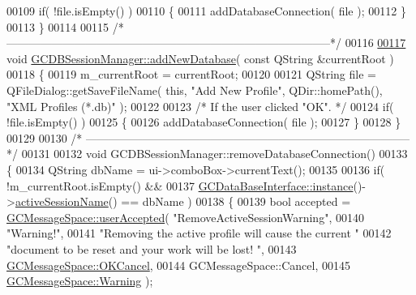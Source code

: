 \begin{DoxyCode}
00109   \textcolor{keywordflow}{if}( !file.isEmpty() )
00110   \{
00111     addDatabaseConnection( file );
00112   \}
00113 \}
00114 
00115 \textcolor{comment}{/*
      --------------------------------------------------------------------------------------*/}
00116 
\hypertarget{gcdbsessionmanager_8cpp_source_l00117}{}\hyperlink{class_g_c_d_b_session_manager_ad029ca4ec8ffff788a281f1b3f3eee71}{00117} \textcolor{keywordtype}{void} \hyperlink{class_g_c_d_b_session_manager_ad029ca4ec8ffff788a281f1b3f3eee71}{GCDBSessionManager::addNewDatabase}( \textcolor{keyword}{const} QString &currentRoot )
00118 \{
00119   m\_currentRoot = currentRoot;
00120 
00121   QString file = QFileDialog::getSaveFileName( \textcolor{keyword}{this}, \textcolor{stringliteral}{"Add New Profile"}, 
      QDir::homePath(), \textcolor{stringliteral}{"XML Profiles (*.db)"} );
00122 
00123   \textcolor{comment}{/* If the user clicked "OK". */}
00124   \textcolor{keywordflow}{if}( !file.isEmpty() )
00125   \{
00126     addDatabaseConnection( file );
00127   \}
00128 \}
00129 
00130 \textcolor{comment}{/*
      --------------------------------------------------------------------------------------*/}
00131 
00132 \textcolor{keywordtype}{void} GCDBSessionManager::removeDatabaseConnection()
00133 \{
00134   QString dbName = ui->comboBox->currentText();
00135 
00136   \textcolor{keywordflow}{if}( !m\_currentRoot.isEmpty() &&
00137       \hyperlink{class_g_c_data_base_interface_a1baea9c0667aa8b610ec30076fcab84c}{GCDataBaseInterface::instance}()->\hyperlink{class_g_c_data_base_interface_a53aff43e5997c5f0180ba214205e5bc6}{activeSessionName}() == dbName )
00138   \{
00139     \textcolor{keywordtype}{bool} accepted = \hyperlink{namespace_g_c_message_space_ae6f97d25f38a6b35c49e6e67ce4afaca}{GCMessageSpace::userAccepted}( \textcolor{stringliteral}{"RemoveActiveSessionWarning"},
00140                                                   \textcolor{stringliteral}{"Warning!"},
00141                                                   \textcolor{stringliteral}{"Removing the active profile
       will cause the current "}
00142                                                   \textcolor{stringliteral}{"document to be reset and
       your work will be lost! "},
00143                                                   \hyperlink{namespace_g_c_message_space_ac1db082c29062fe6508ba03bf76bea44a7de67bd6b388b96a468fcf8246dfdece}{GCMessageSpace::OKCancel},
00144                                                   GCMessageSpace::Cancel,
00145                                                   \hyperlink{namespace_g_c_message_space_a67e94586e09cbc305257fbcdd7b686e2ab454bae3ed7cef63f273c303aea6c4c3}{GCMessageSpace::Warning} );

\end{DoxyCode}
